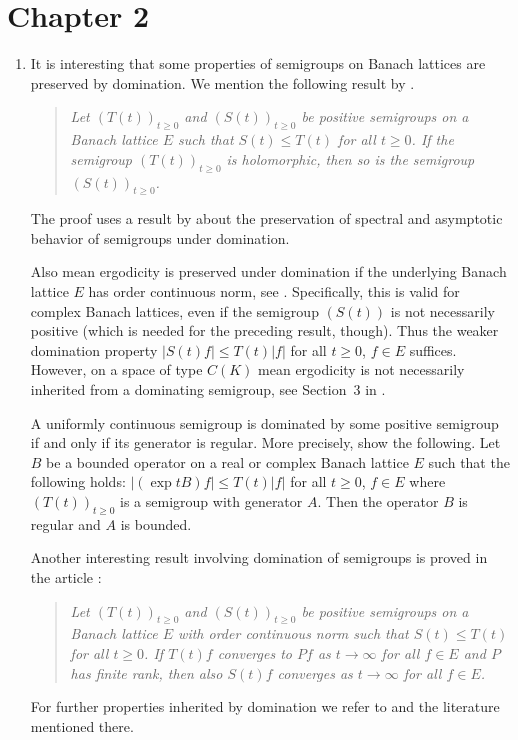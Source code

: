 \section*{Chapter 2}
\begin{enumerate} 

\item 
It is interesting that some properties of semigroups on Banach lattices are preserved by domination.
We mention the following  result by \textcite{zbmath07735826}.
\begin{quote}
\textit{%
Let $(T(t))_{t\geq 0}$ and $(S(t))_{t\geq 0}$ be positive semigroups on a Banach lattice $E$ such that $S(t) \leq T(t)$ for all $t\geq 0$. 
If the semigroup  $(T(t))_{t\geq 0}$ is holomorphic, then so is the semigroup $ (S(t))_{ t\geq 0 } $.} %
\end{quote}
The proof uses a result by \textcite{zbmath01080532} about the preservation of spectral and asymptotic behavior of semigroups under domination.

Also mean ergodicity is preserved under domination  if the underlying Banach lattice $E$ has order continuous norm, see \textcite{zbmath00031435}. 
Specifically, this is valid for complex Banach lattices, even if the semigroup $ (S(t))$ is not necessarily positive (which is needed for the preceding result, though). 
Thus the weaker domination property  
$ \lvert S(t)f \rvert \leq T(t)\lvert f\rvert $ for all $ t\geq 0 $, $ f\in E $ suffices. 
However, on a space of type $C(K)$ mean ergodicity is not necessarily inherited from a dominating semigroup, see Section~3 in \textcite{zbmath00031435}.

A uniformly continuous semigroup is dominated by some positive semigroup if and only if its generator is regular. More precisely, \textcite{zbmath00417080} show the following. Let $B$ be a bounded operator on a real or complex Banach lattice $E$ such that the following holds: 
$\lvert(\exp{tB})f\rvert \leq T(t)\lvert f\rvert $ for all $ t\geq 0 $, $ f\in E $ where $(T(t))_{t\geq 0}$ is a semigroup with generator $A$. Then the operator $B$ is regular and $A$ is bounded.


Another interesting result involving domination of semigroups is proved in the article \textcite{zbmath00537201}:
\begin{quote}
\textit{%
Let $(T(t))_{t\geq 0}$ and $(S(t))_{t\geq 0}$ be positive semigroups on a Banach lattice $E$ with order continuous norm such that $S(t) \leq T(t)$ for all $t\geq 0$.
If\/ $T(t)f$ converges to $Pf$ as $t\rightarrow \infty$ for all $f\in E$ and $P$ has finite rank, then also $S(t)f$ converges as $t\rightarrow \infty$ for all $f\in E$.}
\end{quote}
For further properties inherited by domination we refer to \textcite{zbmath00561284} and the literature mentioned there.


\end{enumerate}
